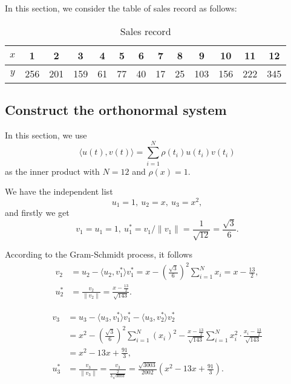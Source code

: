 \documentclass[a4paper]{article}
\begin{document}
In this section, we consider the table of sales record as follows:
\begin{table}[htbp]
    \centering
    \begin{tabular}{c|cccccccccccc}
        \hline
        $x$ & 1 & 2 & 3 & 4 & 5 & 6 & 7 & 8 & 9 & 10 & 11 & 12\\ \hline
        $y$ & 256 & 201 & 159 & 61 & 77 & 40 & 17 & 25 & 103 & 156 & 222 & 345 \\ \hline
    \end{tabular}
    \caption{Sales record}
    \label{tab:sales_record}
\end{table}

\subsection{Construct the orthonormal system}
\label{sec:construct_orthonormal_system}

In this section, we use 
\begin{equation}
    \langle u(t), v(t) \rangle = \sum_{i = 1}^N \rho(t_i) u(t_i) v(t_i)
    \label{eq:4_inner_product}
\end{equation}
as the inner product with $N = 12$ and $\rho(x) = 1$.

We have the independent list 
\begin{equation}
    u_1 = 1,\ u_2 = x,\ u_3 = x^2,
    \label{eq:4_independent_list}
\end{equation}
and firstly we get 
\begin{equation}
    v_1 = u_1 = 1,\ u_1^* = v_1 / \|v_1\| = \frac{1}{\sqrt{12}} = \frac{\sqrt{3}}{6}.
    \label{eq:4_first_column}
\end{equation}

According to the Gram-Schmidt process, it follows
\begin{equation}
    \begin{aligned}
        v_2 &= u_2 - \langle u_2, v_1^* \rangle v_1^* = x - (\frac{\sqrt{3}}{6})^2 \sum_{i = 1}^N x_i = x - \frac{13}{2}, \\
        u_2^* &= \frac{v_2}{\|v_2\|} = \frac{x - \frac{13}{2}}{\sqrt{143}}.
    \end{aligned}
    \label{eq:4_second_column}
\end{equation}

\begin{equation}
    \begin{aligned}
        v_3 &= u_3 - \langle u_3, v_1^* \rangle v_1^* - \langle u_3, v_2^* \rangle v_2^* \\
        &= x^2 - (\frac{\sqrt{3}}{6})^2 \sum_{i = 1}^N (x_i)^2 - \frac{x - \frac{13}{2}}{\sqrt{143}} \sum_{i = 1}^N x_i^2 \cdot \frac{x_i - \frac{13}{2}}{\sqrt{143}} \\
        &= x^2 - 13x + \frac{91}{3}, \\
        u_3^* &= \frac{v_3}{\|v_3\|} = \frac{v_3}{\frac{2}{3\sqrt{3003}}} = \frac{\sqrt{3003}}{2002} (x^2 - 13x + \frac{91}{3}).
    \end{aligned}
    \label{eq:4_third_column}
\end{equation}
\end{document}
